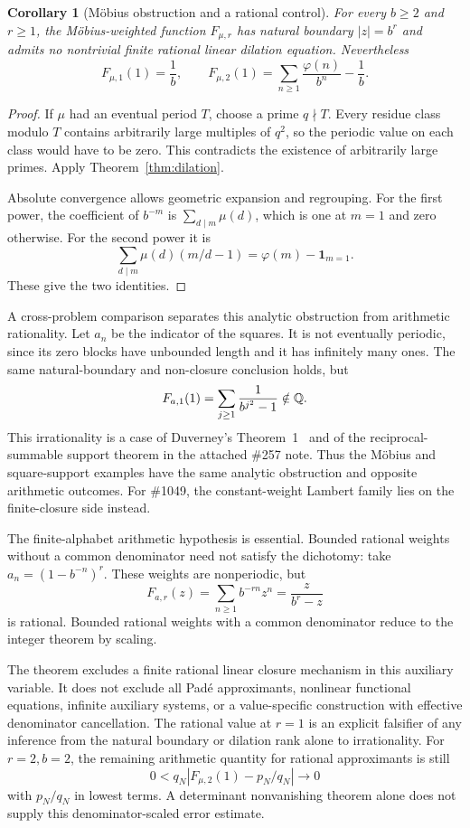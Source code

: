 \documentclass[11pt,a4paper]{article}
\newtheorem{corollary}[theorem]{Corollary}
\theoremstyle{definition}\newtheorem{definition}[theorem]{Definition}
\theoremstyle{remark}\newtheorem*{remark}{Remark}
\newcommand{\ph}{\varphi}\newcommand{\Span}{\operatorname{span}}\newcommand{\ord}{\operatorname{ord}}
\begin{document}
\begin{corollary}[M\"obius obstruction and a rational control]\label{cor:mobius}
For every $b\ge2$ and $r\ge1$, the M\"obius-weighted function $F_{\mu,r}$ has
natural boundary $|z|=b^r$ and admits no nontrivial finite rational linear
dilation equation. Nevertheless
\[
 F_{\mu,1}(1)=\frac1b,\qquad
 F_{\mu,2}(1)=\sum_{n\ge1}\frac{\ph(n)}{b^n}-\frac1b.
\]
\end{corollary}
\begin{proof}
If $\mu$ had an eventual period $T$, choose a prime $q\nmid T$. Every residue
class modulo $T$ contains arbitrarily large multiples of $q^2$, so the
periodic value on each class would have to be zero. This contradicts the
existence of arbitrarily large primes. Apply Theorem~\ref{thm:dilation}.

Absolute convergence allows geometric expansion and regrouping. For the
first power, the coefficient of $b^{-m}$ is $\sum_{d\mid m}\mu(d)$, which is
one at $m=1$ and zero otherwise. For the second power it is
\[
 \sum_{d\mid m}\mu(d)(m/d-1)
 =\ph(m)-\mathbf1_{m=1}.
\]
These give the two identities.
\end{proof}

A cross-problem comparison separates this analytic obstruction from arithmetic
rationality. Let $a_n$ be the indicator of the squares. It is not eventually
periodic, since its zero blocks have unbounded length and it has infinitely
many ones. The same natural-boundary and non-closure conclusion holds, but
\[
 F_{a,1}(1)=\sum_{j\ge1}\frac1{b^{j^2}-1}\notin\mathbb Q.
\]
This irrationality is a case of Duverney's Theorem~1~\cite{duverney} and of the
reciprocal-summable support theorem in the attached \#257 note. Thus the
M\"obius and square-support examples have the same analytic obstruction and
opposite arithmetic outcomes. For \#1049, the constant-weight Lambert family
lies on the finite-closure side instead.

The finite-alphabet arithmetic hypothesis is essential. Bounded rational
weights without a common denominator need not satisfy the dichotomy: take
$a_n=(1-b^{-n})^r$. These weights are nonperiodic, but
\[
 F_{a,r}(z)=\sum_{n\ge1}b^{-rn}z^n=\frac{z}{b^r-z}
\]
is rational. Bounded rational weights with a common denominator reduce to the
integer theorem by scaling.

The theorem excludes a finite rational linear closure mechanism in this
auxiliary variable. It does not exclude all Pad\'e approximants, nonlinear
functional equations, infinite auxiliary systems, or a value-specific
construction with effective denominator cancellation. The rational value at
$r=1$ is an explicit falsifier of any inference from the natural boundary or
dilation rank alone to irrationality. For $r=2,b=2$, the remaining arithmetic
quantity for rational approximants is still
\[
 0<q_N\left|F_{\mu,2}(1)-p_N/q_N\right|\longrightarrow0
\]
with $p_N/q_N$ in lowest terms. A determinant nonvanishing theorem alone does
not supply this denominator-scaled error estimate.
\end{document}
